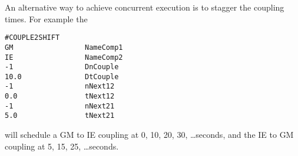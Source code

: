 An alternative way to achieve concurrent execution is to
stagger the coupling times. For example the
\begin{verbatim}
#COUPLE2SHIFT
GM                 NameComp1
IE                 NameComp2
-1                 DnCouple
10.0               DtCouple
-1                 nNext12
0.0                tNext12
-1                 nNext21
5.0                tNext21
\end{verbatim}
will schedule a GM to IE coupling at 0, 10, 20, 30, \ldots seconds,
and the IE to GM coupling at 5, 15, 25, \ldots seconds.
